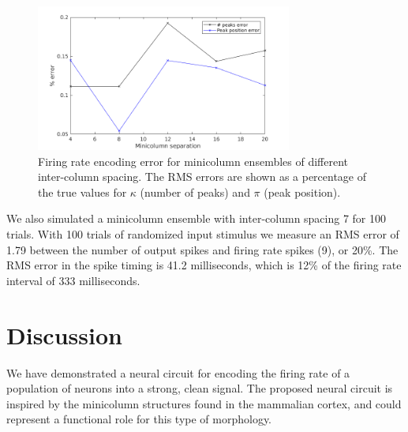 \documentclass[a4paper,11pt]{article}
\begin{document}
\begin{figure}[!ht]
 \caption{Firing rate encoding error for minicolumn ensembles of different inter-column spacing. The RMS errors are shown as a percentage of the true values for $\kappa$ (number of peaks) and $\pi$ (peak position).}
 \label{fig:encoding_results}
 \centering
   \includegraphics[width=0.75\textwidth]{fig/EncodingError_3Trials}
\end{figure}

We also simulated a minicolumn ensemble with inter-column spacing 7 for 100 trials.
With 100 trials of randomized input stimulus we measure an RMS error of 1.79 between the number of output spikes and firing rate spikes (9), or 20\%.
The RMS error in the spike timing is 41.2 milliseconds, which is 12\% of the firing rate interval of 333 milliseconds.


\clearpage
\section{Discussion}
We have demonstrated a neural circuit for encoding the firing rate of a population of neurons into a strong, clean signal.
The proposed neural circuit is inspired by the minicolumn structures found in the mammalian cortex, and could represent a functional role for this type of morphology.


\clearpage
\printbibliography
\end{document}
